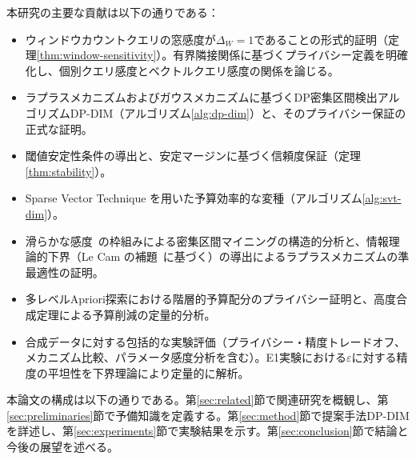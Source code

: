 本研究の主要な貢献は以下の通りである：
\begin{itemize}
  \item ウィンドウカウントクエリの窓感度が$\Delta_W = 1$であることの形式的証明（定理\ref{thm:window-sensitivity}）。有界隣接関係に基づくプライバシー定義を明確化し、個別クエリ感度とベクトルクエリ感度の関係を論じる。
  \item ラプラスメカニズムおよびガウスメカニズムに基づくDP密集区間検出アルゴリズムDP-DIM（アルゴリズム\ref{alg:dp-dim}）と、そのプライバシー保証の正式な証明。
  \item 閾値安定性条件の導出と、安定マージンに基づく信頼度保証（定理\ref{thm:stability}）。
  \item Sparse Vector Technique を用いた予算効率的な変種（アルゴリズム\ref{alg:svt-dim}）。
  \item 滑らかな感度~\cite{nissim2007smooth}の枠組みによる密集区間マイニングの構造的分析と、情報理論的下界（Le Cam の補題~\cite{lecam1973convergence}に基づく）の導出によるラプラスメカニズムの準最適性の証明。
  \item 多レベルApriori探索における階層的予算配分のプライバシー証明と、高度合成定理による予算削減の定量的分析。
  \item 合成データに対する包括的な実験評価（プライバシー・精度トレードオフ、メカニズム比較、パラメータ感度分析を含む）。E1実験における$\varepsilon$に対する精度の平坦性を下界理論により定量的に解析。
\end{itemize}

本論文の構成は以下の通りである。第\ref{sec:related}節で関連研究を概観し、第\ref{sec:preliminaries}節で予備知識を定義する。第\ref{sec:method}節で提案手法DP-DIMを詳述し、第\ref{sec:experiments}節で実験結果を示す。第\ref{sec:conclusion}節で結論と今後の展望を述べる。
